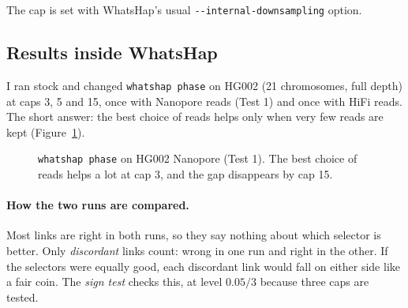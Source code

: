 \documentclass[11pt]{article}
\newcommand{\code}[1]{\texttt{#1}}
\begin{document}
The cap is set with WhatsHap's usual \code{-{}-internal-downsampling} option.

\subsection{Results inside WhatsHap}\label{sec:result1}

I ran stock and changed \code{whatshap phase} on HG002 (21 chromosomes, full
depth) at caps 3, 5 and 15, once with Nanopore reads (Test 1) and once with
HiFi reads. The short answer: the best choice of reads helps only when very
few reads are kept (Figure~\ref{fig:capbars}).

\begin{figure}[h]
\centering
{}
\caption{\code{whatshap phase} on HG002 Nanopore (Test 1). The best choice
of reads helps a lot at cap 3, and the gap disappears by cap 15.}
\label{fig:capbars}
\end{figure}

\paragraph{How the two runs are compared.} Most links are right in both
runs, so they say nothing about which selector is better. Only
\emph{discordant} links count: wrong in one run and right in the other. If
the selectors were equally good, each discordant link would fall on either
side like a fair coin. The \emph{sign test} checks this, at level $0.05/3$
because three caps are tested.
\end{document}
